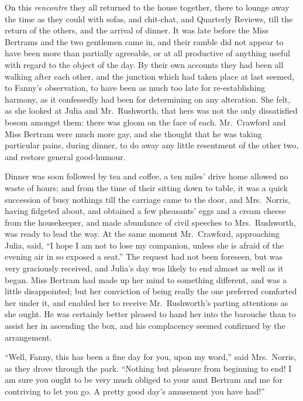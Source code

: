 \documentclass{article}
\begin{document}
On this \emph{rencontre} they all returned to the house together,
there to lounge away the time as they could with sofas,
and chit-chat, and Quarterly Reviews, till the return
of the others, and the arrival of dinner.  It was late
before the Miss Bertrams and the two gentlemen came in,
and their ramble did not appear to have been more than
partially agreeable, or at all productive of anything
useful with regard to the object of the day.  By their
own accounts they had been all walking after each other,
and the junction which had taken place at last seemed,
to Fanny's observation, to have been as much too late
for re-establishing harmony, as it confessedly had
been for determining on any alteration.  She felt,
as she looked at Julia and Mr.\ Rushworth, that hers
was not the only dissatisfied bosom amongst them:
there was gloom on the face of each.  Mr.\ Crawford
and Miss Bertram were much more gay, and she thought
that he was taking particular pains, during dinner,
to do away any little resentment of the other two,
and restore general good-humour.

Dinner was soon followed by tea and coffee, a ten miles'
drive home allowed no waste of hours; and from the time
of their sitting down to table, it was a quick succession
of busy nothings till the carriage came to the door,
and Mrs.\ Norris, having fidgeted about, and obtained a
few pheasants' eggs and a cream cheese from the housekeeper,
and made abundance of civil speeches to Mrs.\ Rushworth,
was ready to lead the way.  At the same moment Mr.\ Crawford,
approaching Julia, said, ``I hope I am not to lose
my companion, unless she is afraid of the evening air
in so exposed a seat.''  The request had not been foreseen,
but was very graciously received, and Julia's day was
likely to end almost as well as it began.  Miss Bertram
had made up her mind to something different, and was a
little disappointed; but her conviction of being really
the one preferred comforted her under it, and enabled her
to receive Mr.\ Rushworth's parting attentions as she ought.
He was certainly better pleased to hand her into
the barouche than to assist her in ascending the box,
and his complacency seemed confirmed by the arrangement.

``Well, Fanny, this has been a fine day for you, upon my word,''
said Mrs.\ Norris, as they drove through the park.
``Nothing but pleasure from beginning to end!  I am sure
you ought to be very much obliged to your aunt Bertram
and me for contriving to let you go.  A pretty good day's
amusement you have had!''
\end{document}

